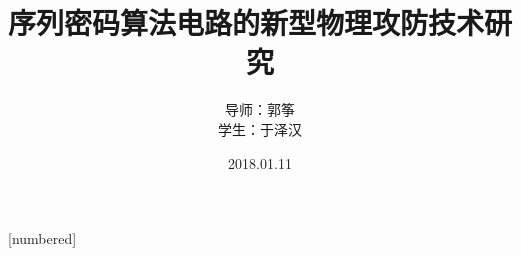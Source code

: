 

\beamertemplatenavigationsymbolsempty  %

\usepackage[UTF8]{ctex}

\usepackage{graphicx}
\usepackage{booktabs}   %

\usepackage{caption} %
\usepackage{subcaption}


[numbered]  %

\title[]{序列密码算法电路的新型物理攻防技术研究}
\author[]{\texorpdfstring{导师：郭\quad 筝 \\ 学生：于泽汉}{}}
\date{2018.01.11}




